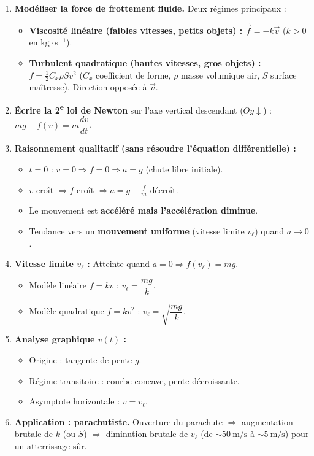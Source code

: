 \documentclass[11pt]{article}
\begin{document}
\begin{methode}
\begin{enumerate}
\item \textbf{Modéliser la force de frottement fluide.}
Deux régimes principaux :
\begin{itemize}
\item \textbf{Viscosité linéaire (faibles vitesses, petits objets) :} $\vec{f}=-k\vec{v}$ ($k>0$ en $\text{kg}\cdot\text{s}^{-1}$).
\item \textbf{Turbulent quadratique (hautes vitesses, gros objets) :} $f=\frac{1}{2}C_x\rho S v^2$ ($C_x$ coefficient de forme, $\rho$ masse volumique air, $S$ surface maîtresse). Direction opposée à $\vec{v}$.
\end{itemize}
\item \textbf{Écrire la 2\textsuperscript{e} loi de Newton} sur l'axe vertical descendant ($Oy\downarrow$) : $mg - f(v) = m\dfrac{dv}{dt}$.
\item \textbf{Raisonnement qualitatif (sans résoudre l'équation différentielle) :}
\begin{itemize}
\item $t=0$ : $v=0 \Rightarrow f=0 \Rightarrow a=g$ (chute libre initiale).
\item $v$ croît $\Rightarrow f$ croît $\Rightarrow a=g-\frac{f}{m}$ décroît.
\item Le mouvement est \textbf{accéléré mais l'accélération diminue}.
\item Tendance vers un \textbf{mouvement uniforme} (vitesse limite $v_\ell$) quand $a\to 0$.
\end{itemize}
\item \textbf{Vitesse limite $v_\ell$ :} Atteinte quand $a=0 \Rightarrow f(v_\ell)=mg$.
\begin{itemize}
\item Modèle linéaire $f=kv$ : $\boxed{v_\ell=\dfrac{mg}{k}}$.
\item Modèle quadratique $f=kv^2$ : $\boxed{v_\ell=\sqrt{\dfrac{mg}{k}}}$.
\end{itemize}
\item \textbf{Analyse graphique $v(t)$ :}
\begin{itemize}
\item Origine : tangente de pente $g$.
\item Régime transitoire : courbe concave, pente décroissante.
\item Asymptote horizontale : $v=v_\ell$.
\end{itemize}
\item \textbf{Application : parachutiste.} Ouverture du parachute $\Rightarrow$ augmentation brutale de $k$ (ou $S$) $\Rightarrow$ diminution brutale de $v_\ell$ (de $\sim 50\ \text{m/s}$ à $\sim 5\ \text{m/s}$) pour un atterrissage sûr.
\end{enumerate}
\end{methode}
\end{document}
